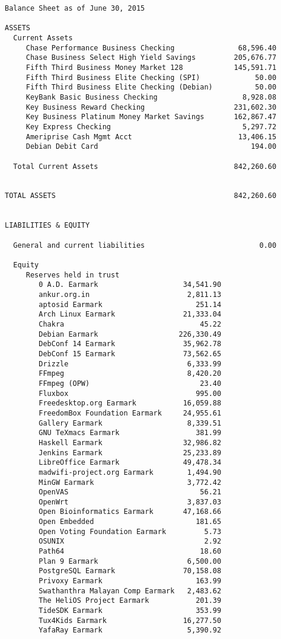 \documentclass[letterpaper]{report}
\begin{document}
\begin{verbatim}
Balance Sheet as of June 30, 2015

ASSETS
  Current Assets
     Chase Performance Business Checking               68,596.40
     Chase Business Select High Yield Savings         205,676.77
     Fifth Third Business Money Market 128            145,591.71
     Fifth Third Business Elite Checking (SPI)             50.00
     Fifth Third Business Elite Checking (Debian)          50.00
     KeyBank Basic Business Checking                    8,928.08
     Key Business Reward Checking                     231,602.30
     Key Business Platinum Money Market Savings       162,867.47
     Key Express Checking                               5,297.72
     Ameriprise Cash Mgmt Acct                         13,406.15
     Debian Debit Card                                    194.00

  Total Current Assets                                842,260.60


TOTAL ASSETS                                          842,260.60


LIABILITIES & EQUITY

  General and current liabilities                           0.00

  Equity
     Reserves held in trust
        0 A.D. Earmark                    34,541.90
        ankur.org.in                       2,811.13
        aptosid Earmark                      251.14
        Arch Linux Earmark                21,333.04
        Chakra                                45.22
        Debian Earmark                   226,330.49
        DebConf 14 Earmark                35,962.78
        DebConf 15 Earmark                73,562.65
        Drizzle                            6,333.99
        FFmpeg                             8,420.20
        FFmpeg (OPW)                          23.40
        Fluxbox                              995.00
        Freedesktop.org Earmark           16,059.88
        FreedomBox Foundation Earmark     24,955.61
        Gallery Earmark                    8,339.51
        GNU TeXmacs Earmark                  381.99
        Haskell Earmark                   32,986.82
        Jenkins Earmark                   25,233.89
        LibreOffice Earmark               49,478.34
        madwifi-project.org Earmark        1,494.90
        MinGW Earmark                      3,772.42
        OpenVAS                               56.21
        OpenWrt                            3,837.03
        Open Bioinformatics Earmark       47,168.66
        Open Embedded                        181.65
        Open Voting Foundation Earmark         5.73
        OSUNIX                                 2.92
        Path64                                18.60
        Plan 9 Earmark                     6,500.00
        PostgreSQL Earmark                70,158.08
        Privoxy Earmark                      163.99
        Swathanthra Malayan Comp Earmark   2,483.62
        The HeliOS Project Earmark           201.39
        TideSDK Earmark                      353.99
        Tux4Kids Earmark                  16,277.50
        YafaRay Earmark                    5,390.92


\end{verbatim}
\end{document}
